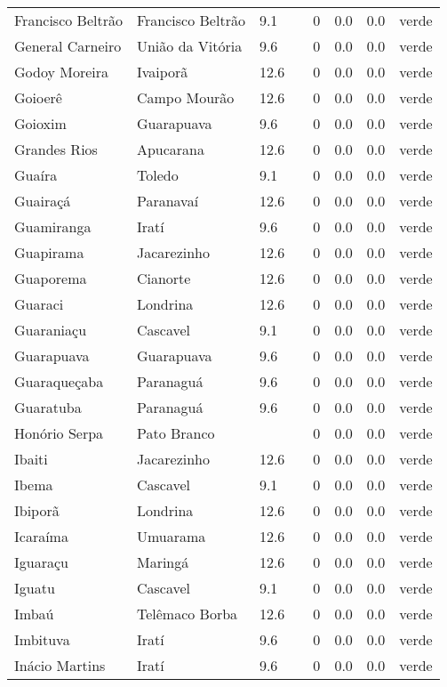 \begin{longtable}{l|lllllll}
  Francisco Beltrão & Francisco Beltrão & 9.1 &  & 0 & 0.0 & 0.0 & verde \\ 
  General Carneiro & União da Vitória & 9.6 &  & 0 & 0.0 & 0.0 & verde \\ 
  Godoy Moreira & Ivaiporã & 12.6 &  & 0 & 0.0 & 0.0 & verde \\ 
  Goioerê & Campo Mourão & 12.6 &  & 0 & 0.0 & 0.0 & verde \\ 
  Goioxim & Guarapuava & 9.6 &  & 0 & 0.0 & 0.0 & verde \\ 
  Grandes Rios & Apucarana & 12.6 &  & 0 & 0.0 & 0.0 & verde \\ 
  Guaíra & Toledo & 9.1 &  & 0 & 0.0 & 0.0 & verde \\ 
  Guairaçá & Paranavaí & 12.6 &  & 0 & 0.0 & 0.0 & verde \\ 
  Guamiranga & Iratí & 9.6 &  & 0 & 0.0 & 0.0 & verde \\ 
  Guapirama & Jacarezinho & 12.6 &  & 0 & 0.0 & 0.0 & verde \\ 
  Guaporema & Cianorte & 12.6 &  & 0 & 0.0 & 0.0 & verde \\ 
  Guaraci & Londrina & 12.6 &  & 0 & 0.0 & 0.0 & verde \\ 
  Guaraniaçu & Cascavel & 9.1 &  & 0 & 0.0 & 0.0 & verde \\ 
  Guarapuava & Guarapuava & 9.6 &  & 0 & 0.0 & 0.0 & verde \\ 
  Guaraqueçaba & Paranaguá & 9.6 &  & 0 & 0.0 & 0.0 & verde \\ 
  Guaratuba & Paranaguá & 9.6 &  & 0 & 0.0 & 0.0 & verde \\ 
  Honório Serpa & Pato Branco &  &  & 0 & 0.0 & 0.0 & verde \\ 
  Ibaiti & Jacarezinho & 12.6 &  & 0 & 0.0 & 0.0 & verde \\ 
  Ibema & Cascavel & 9.1 &  & 0 & 0.0 & 0.0 & verde \\ 
  Ibiporã & Londrina & 12.6 &  & 0 & 0.0 & 0.0 & verde \\ 
  Icaraíma & Umuarama & 12.6 &  & 0 & 0.0 & 0.0 & verde \\ 
  Iguaraçu & Maringá & 12.6 &  & 0 & 0.0 & 0.0 & verde \\ 
  Iguatu & Cascavel & 9.1 &  & 0 & 0.0 & 0.0 & verde \\ 
  Imbaú & Telêmaco Borba & 12.6 &  & 0 & 0.0 & 0.0 & verde \\ 
  Imbituva & Iratí & 9.6 &  & 0 & 0.0 & 0.0 & verde \\ 
  Inácio Martins & Iratí & 9.6 &  & 0 & 0.0 & 0.0 & verde \\ 

\end{longtable}
